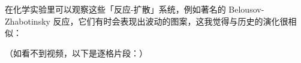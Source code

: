 \documentclass[12pt]{report}
\newcommand{\cc}[2]{#1}
\newcommand{\cc}[2]{#2}
\begin{document}
{{}

\cc{
在化学实验里可以观察这些「反应-扩散」系统，例如著名的 Belousov-Zhabotinsky 反应，它们有时会表现出波动的图案，这我觉得与历史的演化很相似：
}{
	
}

\begin{figure}[ht]
\centering
{}
\end{figure}

\cc{
（如看不到视频，以下是逐格片段：）
}{
	
}

}
\end{document}
